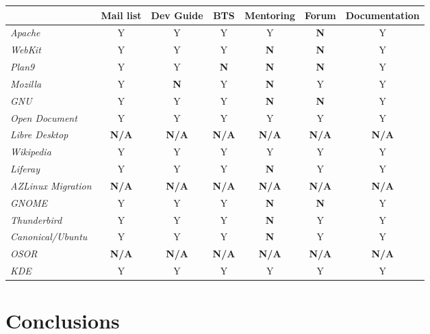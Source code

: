 \documentclass[11pt]{scrartcl}
\begin{document}
\begin{center}
    \begin{tabular}{ | l | c | c | c | c | c | c | }
        \hline
        & \textbf{Mail list} & \textbf{Dev Guide} & \textbf{BTS} & \textbf{Mentoring} & \textbf{Forum} & \textbf{Documentation} \\ \hline
        \hline 
        \emph{Apache}              & Y & Y & Y & Y & \textbf{N} & Y \\ \hline
        \emph{WebKit}              & Y & Y & Y & \textbf{N} & \textbf{N} & Y  \\ \hline
        \emph{Plan9}               & Y & Y & \textbf{N} & \textbf{N} & \textbf{N} & Y \\ \hline
        \emph{Mozilla}             & Y & \textbf{N} & Y & \textbf{N} & Y & Y  \\ \hline
        \emph{GNU}                 & Y & Y & Y & \textbf{N} & \textbf{N} & Y \\ \hline
        \emph{Open Document}       & Y & Y & Y & Y & Y & Y \\ \hline
        \emph{Libre Desktop}       & \textbf{N/A} & \textbf{N/A} & \textbf{N/A} & \textbf{N/A} & \textbf{N/A} & \textbf{N/A} \\ \hline
        \emph{Wikipedia}           & Y & Y & Y & Y & Y & Y \\ \hline
        \emph{Liferay}             & Y & Y & Y & \textbf{N} & Y & Y \\ \hline
        \emph{AZLinux Migration}   & \textbf{N/A} & \textbf{N/A} & \textbf{N/A} & \textbf{N/A} & \textbf{N/A} & \textbf{N/A} \\ \hline
        \emph{GNOME}               & Y & Y & Y & \textbf{N} & \textbf{N} & Y \\ \hline
        \emph{Thunderbird}         & Y & Y & Y & \textbf{N} & Y & Y\\ \hline
        \emph{Canonical/Ubuntu}           & Y & Y & Y & \textbf{N} & Y & Y \\ \hline
        \emph{OSOR}                & \textbf{N/A} & \textbf{N/A} & \textbf{N/A} & \textbf{N/A} & \textbf{N/A} & \textbf{N/A} \\ \hline
        \emph{KDE}                 & Y & Y & Y & Y & Y & Y \\ \hline
    \end{tabular}
\end{center}


\section{Conclusions}
\label{sec:conclusions}
\end{document}

